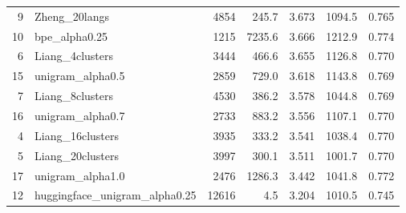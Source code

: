 \begin{table}
\begin{tabular}{rlrrrrr}
9 & Zheng\_20langs & 4854 & 245.7 & 3.673 & 1094.5 & 0.765 \\
10 & bpe\_alpha0.25 & 1215 & 7235.6 & 3.666 & 1212.9 & 0.774 \\
6 & Liang\_4clusters & 3444 & 466.6 & 3.655 & 1126.8 & 0.770 \\
15 & unigram\_alpha0.5 & 2859 & 729.0 & 3.618 & 1143.8 & 0.769 \\
7 & Liang\_8clusters & 4530 & 386.2 & 3.578 & 1044.8 & 0.769 \\
16 & unigram\_alpha0.7 & 2733 & 883.2 & 3.556 & 1107.1 & 0.770 \\
4 & Liang\_16clusters & 3935 & 333.2 & 3.541 & 1038.4 & 0.770 \\
5 & Liang\_20clusters & 3997 & 300.1 & 3.511 & 1001.7 & 0.770 \\
17 & unigram\_alpha1.0 & 2476 & 1286.3 & 3.442 & 1041.8 & 0.772 \\
12 & huggingface\_unigram\_alpha0.25 & 12616 & 4.5 & 3.204 & 1010.5 & 0.745 \\
\bottomrule
\end{tabular}
\end{table}
